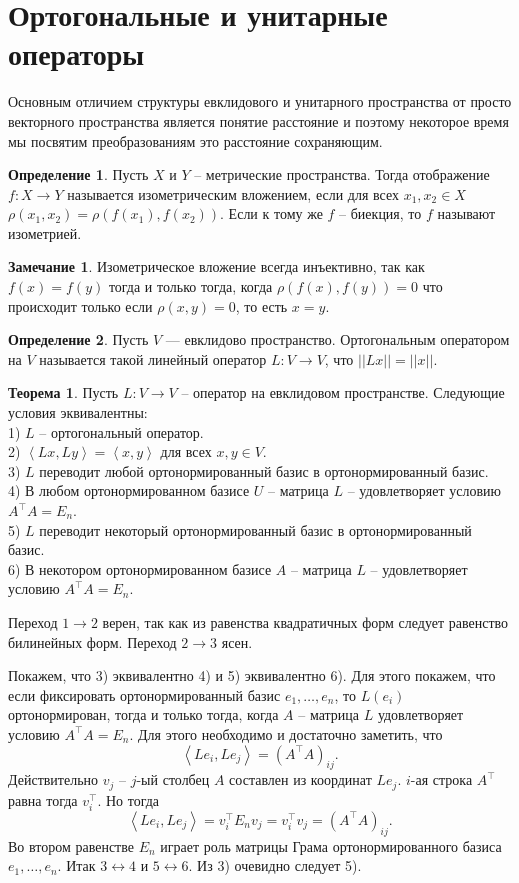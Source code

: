\documentclass[10pt,a4paper,oneside]{book} %
\theoremstyle{definition}
\newtheorem*{rem}{Замечание}
\newtheorem*{defn}{Определение}
\newtheorem{thm}{Теорема}
\def\lan{\left\langle }
\def\ran{\right\rangle}
\def\thrm{\begin{thm}}
\def\ethrm{\end{thm}}
\def\dfn{\begin{defn}}
\def\edfn{\end{defn}}
\def\rm{\begin{rem}}
\def\erm{\end{rem}}
\begin{document}
\section{Ортогональные и унитарные операторы}

Основным отличием структуры евклидового и унитарного пространства от просто векторного пространства является понятие расстояние и поэтому некоторое время мы посвятим преобразованиям это расстояние сохраняющим.

\dfn Пусть $X$ и $Y$ -- метрические пространства. Тогда отображение $f\colon X \to Y$ называется изометрическим вложением, если для всех $x_1,x_2 \in X$ $\rho(x_1,x_2)=\rho(f(x_1),f(x_2))$. Если к тому же $f$ -- биекция, то $f$ называют изометрией.
\edfn

\rm Изометрическое вложение всегда инъективно, так как $f(x)=f(y)$ тогда и только тогда, когда $\rho(f(x),f(y))=0$ что происходит только если $\rho(x,y)=0$, то есть $x=y$.
\erm


\dfn Пусть $V$ --- евклидово пространство. Ортогональным оператором на $V$ называется такой линейный оператор $L \colon V \to V$, что $||Lx||=
||x||$.
\edfn

\thrm Пусть $L\colon V \to V$ -- оператор на евклидовом пространстве. Следующие условия эквивалентны:\\
1) $L$ -- ортогональный оператор.\\
2) $\lan Lx,Ly\ran=\lan x,y \ran$ для всех $x,y \in V$.\\
3) $L$ переводит любой ортонормированный базис в ортонормированный базис.\\
4) В любом ортонормированном базисе $U$ -- матрица $L$ -- удовлетворяет условию $A^{\top} A = E_n$.\\
5) $L$ переводит некоторый ортонормированный базис в ортонормированный базис.\\
6) В некотором ортонормированном базисе $A$ -- матрица $L$ --  удовлетворяет условию $A^{\top} A = E_n$.
\ethrm
\proof
Переход $1\to 2$ верен, так как из равенства квадратичных форм следует равенство билинейных форм. Переход $2\to 3$ ясен.


Покажем, что 3) эквивалентно 4) и 5) эквивалентно 6). Для этого покажем, что если фиксировать ортонормированный базис $e_1,\dots, e_n$, то $L(e_i)$ ортонормирован, тогда и только тогда, когда $A$ -- матрица $L$ удовлетворяет условию $A^{\top}A=E_n$. Для этого необходимо и достаточно заметить, что $$\lan Le_i, Le_j \ran = (A^{\top}A)_{ij}.$$
Действительно $v_j$ -- $j$-ый столбец $A$ составлен из координат $Le_j$. $i$-ая строка $A^{\top}$ равна тогда $v_i^{\top}$. Но тогда $$\lan Le_i,Le_j\ran = v_i^{\top}E_n v_j= v_i^{\top}v_j= (A^{\top}A)_{ij}.$$
Во втором равенстве $E_n$ играет роль матрицы Грама ортонормированного базиса $e_1,\dots, e_n$.
Итак $3 \leftrightarrow 4$ и $5 \leftrightarrow 6$. Из 3) очевидно следует 5).
\end{document}
